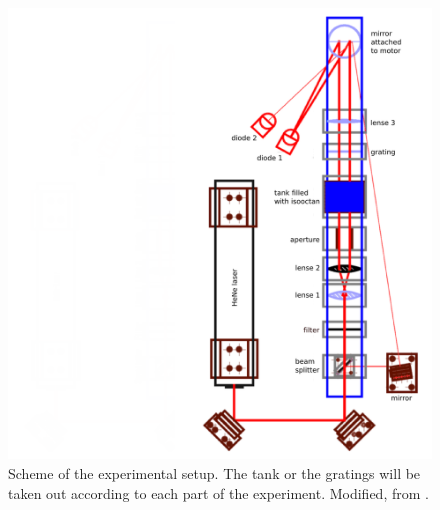 \begin{figure}
    \centering
    \includegraphics[width=1.0\textwidth]{figures/setup_bitmap.png}
    \caption{
        Scheme of the experimental setup. The tank or the gratings will be taken out 
        according to each part of the experiment.
        Modified, from \cite{ver}.
        }
    \label{fig:setup}
\end{figure}
